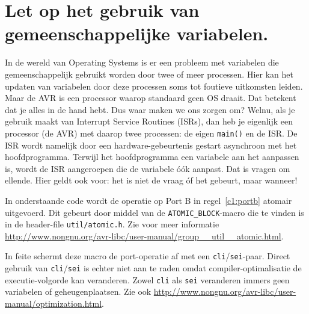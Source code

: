 \documentclass[12pt,a4paper,final,twoside,fleqn]{article}
\def\lstC{\lstinline[style=C]}
\def\lstAVR{\lstinline[style=AVR]}
\begin{document}
\section{Let op het gebruik van gemeenschappelijke variabelen.}
\label{sec:gemvar}
In de wereld van Operating Systems is er een probleem met variabelen die
gemeenschappelijk gebruikt worden door twee of meer processen. Hier kan het updaten
van variabelen door deze processen soms tot foutieve uitkomsten leiden. Maar de AVR
is een processor waarop standaard geen OS draait. Dat betekent dat je alles in de
hand hebt. Dus waar maken we ons zorgen om? Welnu, als je gebruik maakt van Interrupt
Service Routines (ISRs), dan heb je eigenlijk een processor (de AVR) met daarop twee
processen: de eigen \lstC{main()} en de ISR. De ISR wordt namelijk door een
hardware-gebeurtenis gestart asynchroon met het hoofdprogramma. Terwijl het
hoofdprogramma een variabele aan het aanpassen is, wordt de ISR aangeroepen die de
variabele \'{o}\'{o}k aanpast. Dat is vragen om ellende. Hier geldt ook voor: het
is niet de vraag \'{o}f het gebeurt, maar wanneer!

In onderstaande code wordt de operatie op Port B in regel~\ref{c1:portb} atomair
uitgevoerd. Dit gebeurt door middel van de \lstC{ATOMIC_BLOCK}-macro die te vinden
is in de header-file \mbox{\lstC{util/atomic.h}}. Zie voor meer informatie
\url{http://www.nongnu.org/avr-libc/user-manual/group__util__atomic.html}.


In feite schermt deze macro de port-operatie af met een \lstAVR{cli}/\lstAVR{sei}-paar.
Direct gebruik van \lstAVR{cli}/\lstAVR{sei} is echter niet aan te raden omdat
compiler-optimalisatie de executie-volgorde kan veranderen. Zowel \lstAVR{cli} als
\lstAVR{sei} veranderen immers geen variabelen of geheugenplaatsen. Zie ook
\url{http://www.nongnu.org/avr-libc/user-manual/optimization.html}.
\end{document}
